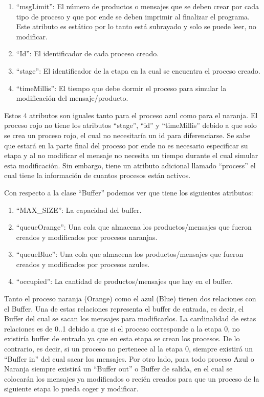 \documentclass[a4paper]{article}
\begin{document}
    \begin{enumerate}
        \item “msgLimit”: El número de productos o mensajes que se deben crear por cada tipo de proceso y que por ende se deben imprimir al finalizar el programa. Este atributo es estático por lo tanto está subrayado y solo se puede leer, no modificar.  
        \item “Id”: El identificador de cada proceso creado. 
        \item “stage”: El identificador de la etapa en la cual se encuentra el proceso creado. 
        \item “timeMillis”: El tiempo que debe dormir el proceso para simular la modificación del mensaje/producto. 
    \end{enumerate}
    Estos 4 atributos son iguales tanto para el proceso azul como para el naranja. El proceso rojo no tiene los atributos “stage”, “id” y “timeMillis” debido a que solo se crea un proceso rojo, el cual no necesitaría un id para diferenciarse. Se sabe que estará en la parte final del proceso por ende no es necesario especificar su etapa y al no modificar el mensaje no necesita un tiempo durante el cual simular esta modificación. Sin embargo, tiene un atributo adicional llamado “process” el cual tiene la información de cuantos procesos están activos. 

    Con respecto a la clase “Buffer” podemos ver que tiene los siguientes atributos: 
    \begin{enumerate}
        \item “MAX_SIZE”: La capacidad del buffer. 

        \item “queueOrange”: Una cola que almacena los productos/mensajes que fueron creados y modificados por procesos naranjas. 
        
        \item “queueBlue”: Una cola que almacena los productos/mensajes que fueron creados y modificados por procesos azules. 
        
        \item “occupied”: La cantidad de productos/mensajes que hay en el buffer. 
    \end{enumerate}
     

    Tanto el proceso naranja (Orange) como el azul (Blue) tienen dos relaciones con el Buffer. Una de estas relaciones representa el buffer de entrada, es decir, el Buffer del cual se sacan los mensajes para modificarlos. La cardinalidad de estas relaciones es de 0..1 debido a que si el proceso corresponde a la etapa 0, no existiría buffer de entrada ya que en esta etapa se crean los procesos. De lo contrario, es decir, si un proceso no pertenece al la etapa 0, siempre existirá un “Buffer in” del cual sacar los mensajes. Por otro lado, para todo proceso Azul o Naranja siempre existirá un “Buffer out” o Buffer de salida, en el cual se colocarán los mensajes ya modificados o recién creados para que un proceso de la siguiente etapa lo pueda coger y modificar. 
\end{document}
